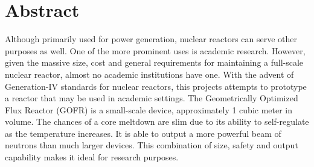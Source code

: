 \section*{Abstract}
\label{sec:abstract}
Although primarily used for power generation, nuclear reactors can serve other purposes as well. One of the more prominent uses is academic research. However, given the massive size, cost and general requirements for maintaining a full-scale nuclear reactor, almost no academic institutions have one. With the advent of Generation-IV standards for nuclear reactors, this projects attempts to prototype a reactor that may be used in academic settings. The Geometrically Optimized Flux Reactor (GOFR) is a small-scale device, approximately 1 cubic meter in volume. The chances of a core meltdown are slim due to its ability to self-regulate as the temperature increases. It is able to output a more powerful beam of neutrons than much larger devices. This combination of size, safety and output capability makes it ideal for research purposes.
